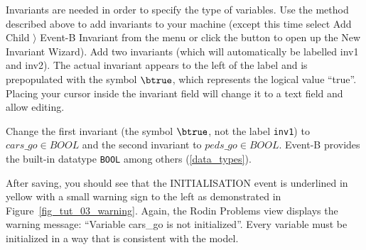 Invariants are needed in order to specify the type of variables. Use the method described above to add invariants to your machine (except this time select \textsf{Add Child $\rangle$ Event-B Invariant} from the menu or click the  button to open up the New Invariant Wizard). Add two invariants (which will automatically be labelled \textsf{inv1} and \textsf{inv2}). The actual invariant appears to the left of the label and is prepopulated with the symbol $\btrue$, which represents the logical value ``true''. Placing your cursor inside the invariant field will change it to a text field and allow editing. 

Change the first invariant (the symbol $\btrue$, not the label \texttt{inv1}) to $cars\_go \in  BOOL$ and the second invariant to $peds\_go \in  BOOL$.
Event-B provides the built-in datatype \texttt{BOOL} among others (\ref{data_types}).



After saving, you should see that the \textsf{INITIALISATION} event is underlined in yellow with a small warning sign to the left as demonstrated in Figure~\ref{fig_tut_03_warning}. Again, the \textsf{Rodin Problems} view displays the warning message: ``Variable cars\_go is not initialized''. Every variable must be initialized in a way that is consistent with the model.

